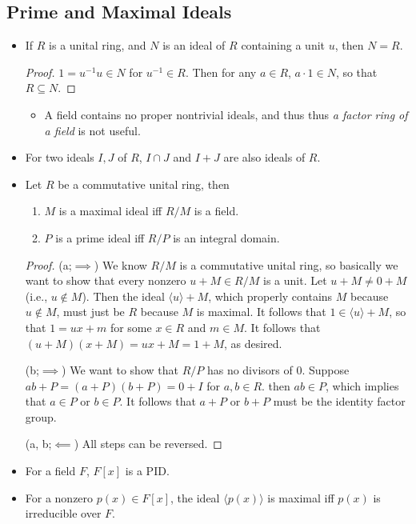 \documentclass[11pt]{article}
\newcommand{\gen}[1]{\langle #1 \rangle}
\begin{document}
\subsection{Prime and Maximal Ideals}
\begin{itemize}
    \item If $R$ is a unital ring, and $N$ is an ideal of $R$ containing a unit $u$, then $N = R$.
    \begin{proof}
        $1 = u^{-1} u \in N$ for $u^{-1} \in R$. Then for any $a \in R$, $a \cdot 1 \in N$, so that $R \subseteq N$.
    \end{proof}
    \begin{itemize}
        \item A field contains no proper nontrivial ideals, and thus thus \emph{a factor ring of a field} is not useful.
    \end{itemize}
    \item For two ideals $I,J$ of $R$, $I \cap J$ and $I + J$ are also ideals of $R$.
    \item Let $R$ be a commutative unital ring, then
    \begin{enumerate}[label=(\alph*)]
        \item  $M$ is a maximal ideal iff $R/M$ is a field.
        \item $P$ is a prime ideal iff $R/P$ is an integral domain.
    \end{enumerate}
    \begin{proof}
        (a;$\implies$) We know $R/M$ is a commutative unital ring, so basically we want to show that every nonzero $u+M \in R/M$ is a unit. Let $u+M \neq 0+M$ (i.e., $u \notin M$). Then the ideal $\gen{u} + M$, which properly contains $M$ because $u \notin M$, must just be $R$ because $M$ is maximal. It follows that $1 \in \gen{u} + M$, so that $1 = ux + m$ for some $x \in R$ and $m \in M$. It follows that $(u+M)(x+M) = ux + M = 1 + M$, as desired.
        
        (b;$\implies$) We want to show that $R/P$ has no divisors of 0. Suppose $ab + P = (a+P)(b+P) = 0+I$ for $a,b \in R$. then $ab \in P$, which implies that $a \in P$ or $b \in P$. It follows that $a+P$ or $b+P$ must be the identity factor group.
        
        (a, b;$\impliedby$) All steps can be reversed.
    \end{proof}
    \item For a field $F$, $F[x]$ is a PID.
    \item For a nonzero $p(x) \in F[x]$, the ideal $\gen{p(x)}$ is maximal iff $p(x)$ is irreducible over $F$.
\end{itemize}
\end{document}
